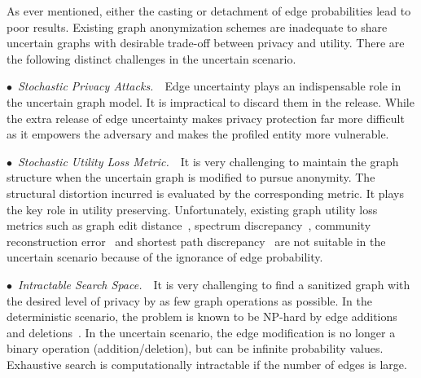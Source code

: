 As ever mentioned, either the casting or detachment of edge probabilities lead to poor results. Existing graph anonymization schemes are inadequate to share uncertain graphs with desirable trade-off between privacy and utility. 
There are the following distinct challenges in the uncertain scenario. 

$\bullet$~\textup{\emph{Stochastic Privacy Attacks.}}~~Edge uncertainty plays an indispensable role in the uncertain graph model. It is impractical to discard them in the release.  
While the extra release of edge uncertainty makes privacy protection far more difficult as it empowers the adversary and makes the profiled entity more vulnerable. 

$\bullet$~\textup{\emph{Stochastic Utility Loss Metric.}}~~It is very challenging to maintain the graph structure when the uncertain graph is modified to pursue anonymity. The structural distortion incurred is evaluated by the corresponding metric.  It plays the key role in utility preserving. Unfortunately, existing graph utility loss metrics such as graph edit distance~\cite{Liu_Towards_2008}, spectrum discrepancy~\cite{Ying_Randomizing_2008}, community reconstruction error~\cite{Wang2011} and shortest path discrepancy~\cite{Liu_Privacy_2009} are not suitable in the uncertain scenario because of the ignorance of edge probability. 

$\bullet$~\textup{\emph{Intractable Search Space.}}~~It is very challenging to find a sanitized graph with the desired level of privacy by as few graph operations as possible. 
In the deterministic scenario, the problem is known to be NP-hard by edge additions and deletions~\cite{Hartung_Theory_2015}. 
In the uncertain scenario, the edge modification is no longer a binary operation (addition/deletion), but can be infinite probability values. Exhaustive search is computationally intractable if the number of edges is large.

